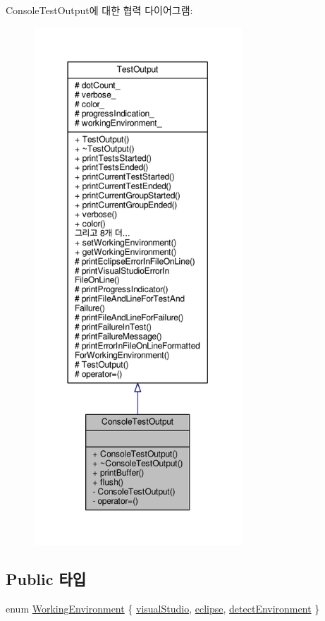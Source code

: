 Console\+Test\+Output에 대한 협력 다이어그램\+:
\nopagebreak
\begin{figure}[H]
\begin{center}
\leavevmode
\includegraphics[height=550pt]{class_console_test_output__coll__graph}
\end{center}
\end{figure}
\subsection*{Public 타입}
\begin{DoxyCompactItemize}
\item 
enum \hyperlink{class_test_output_a0541851f863713454486a9fb3080f766}{Working\+Environment} \{ \hyperlink{class_test_output_a0541851f863713454486a9fb3080f766a47f3a5b9ed4237588024b983a4ca8399}{visual\+Studio}, 
\hyperlink{class_test_output_a0541851f863713454486a9fb3080f766abf6505364f680c2682d5648cd0c76f53}{eclipse}, 
\hyperlink{class_test_output_a0541851f863713454486a9fb3080f766a3f11f791db94db142e33c3c75442ed10}{detect\+Environment}
 \}
\end{DoxyCompactItemize}
